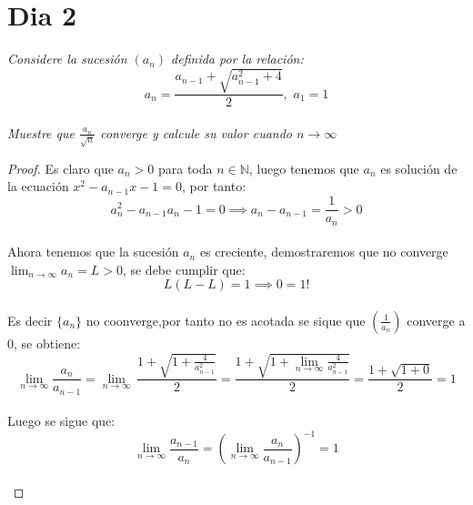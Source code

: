 \documentclass[11pt]{article}
\newcommand{\N}{\mathbb{N}}
\begin{document}
\section*{Dia 2}
\begin{tcolorbox}[title = \textcolor{black}{\textcolor{white}{Problema 6}}]
    \textit{Considere la sucesi\'on $(a_n)$ definida por la relaci\'on:
    \begin{equation*}
        a_n=\frac{a_{n-1}+\sqrt{a^2_{n-1}+4}}{2},\,\,a_1=1
    \end{equation*}\,\\
    Muestre que $\frac{a_n}{\sqrt{n}}$ converge y calcule su valor cuando $n\to\infty$}
\end{tcolorbox}
\begin{proof}
   Es claro que $a_n>0$ para toda $n\in \N$, luego tenemos que $a_n$ es soluci\'on de la ecuaci\'on $x^2-a_{n-1}x-1=0$, por tanto:\,\\
   \begin{equation*}
    a_n^2-a_{n-1}a_n-1=0\implies a_n-a_{n-1}=\frac{1}{a_n}>0
   \end{equation*}\,\\
   Ahora tenemos que la sucesi\'on $a_n$ es creciente, demostraremos que no converge $\displaystyle\lim_{n\to\infty}a_n=L>0$, se debe cumplir que:\,\\
   \begin{equation*}
    L(L-L)=1\implies 0=1!
   \end{equation*}\,\\
   Es decir $\{a_n\}$ no coonverge,por tanto no es acotada se sique que $\left(\frac{1}{a_n}\right)$ converge a $0$, se obtiene:\,\\
   \begin{equation*}
    \lim_{n\to\infty}\frac{a_{n}}{a_{n-1}}=\lim_{n\rightarrow \infty}\,\frac{1+\sqrt{1+\frac{4}{a_{n-1}^2}}}{2}=\frac{1+\sqrt{1+\displaystyle\lim_{n\rightarrow \infty}\frac{4}{a_{n-1}^2}}}{2}=\frac{1+\sqrt{1+0}}{2}=1
   \end{equation*}\,\\
   Luego se sigue que:\,\\
   \begin{equation*}
    \lim_{n\to\infty}\frac{a_{n-1}}{a_n}=\left(\lim_{n\to\infty}\frac{a_{n}}{a_{n-1}}\right)^{-1}=1
   \end{equation*}\,\\


\end{proof}
\end{document}
